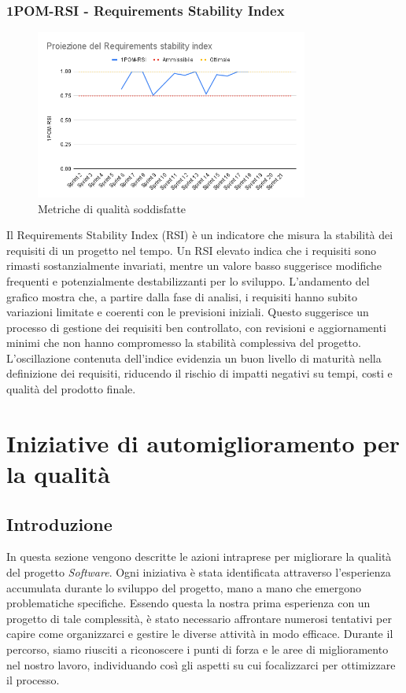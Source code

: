 \documentclass{article}
\begin{document}
        \subsubsection{1POM-RSI - Requirements Stability Index}
        \begin{figure}[H]
            \centering
            \includegraphics[width=0.8\textwidth]{../../../img/pdq_charts/chart7-proiezioneRSI.png}
            \caption{Metriche di qualità soddisfatte}
        \end{figure}
        Il Requirements Stability Index (RSI) è un indicatore che misura la stabilità dei requisiti di un progetto nel tempo. Un RSI elevato indica che i requisiti sono rimasti sostanzialmente invariati, mentre un valore basso suggerisce modifiche frequenti e potenzialmente destabilizzanti per lo sviluppo.
        L’andamento del grafico mostra che, a partire dalla fase di analisi, i requisiti hanno subito variazioni limitate e coerenti con le previsioni iniziali. Questo suggerisce un processo di gestione dei requisiti ben controllato, con revisioni e aggiornamenti minimi che non hanno compromesso la stabilità complessiva del progetto.
        L’oscillazione contenuta dell’indice evidenzia un buon livello di maturità nella definizione dei requisiti, riducendo il rischio di impatti negativi su tempi, costi e qualità del prodotto finale.


\newpage
\section{Iniziative di automiglioramento per la qualità}
\subsection{Introduzione}
In questa sezione vengono descritte le azioni intraprese per migliorare la qualità del progetto \textit{Software}. 
Ogni iniziativa è stata identificata attraverso l’esperienza accumulata durante lo sviluppo del progetto, mano a mano che emergono problematiche specifiche. 
Essendo questa la nostra prima esperienza con un progetto di tale complessità, è stato necessario affrontare numerosi tentativi per capire come organizzarci e gestire le diverse attività in modo efficace. 
Durante il percorso, siamo riusciti a riconoscere i punti di forza e le aree di miglioramento nel nostro lavoro, individuando così gli aspetti su cui focalizzarci per ottimizzare il processo. 
\end{document}
